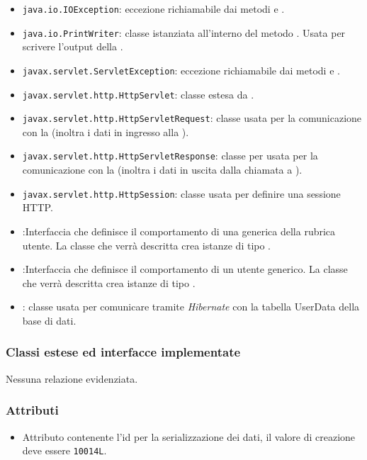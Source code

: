 \begin{itemize}
	\item \texttt{java.io.IOException}: eccezione richiamabile dai metodi  e .
	\item \texttt{java.io.PrintWriter}: classe istanziata all'interno del metodo . Usata per scrivere l'output della .
	\item \texttt{javax.servlet.ServletException}: eccezione richiamabile dai metodi  e .
	\item \texttt{javax.servlet.http.HttpServlet}: classe estesa da .
	\item \texttt{javax.servlet.http.HttpServletRequest}:  classe usata per la comunicazione con la  (inoltra i dati in ingresso alla ).
	\item \texttt{javax.servlet.http.HttpServletResponse}: classe per usata per la comunicazione con la  (inoltra i dati in uscita dalla chiamata a ).
	\item \texttt{javax.servlet.http.HttpSession}: classe usata per definire una sessione HTTP.
	\item {}:Interfaccia che definisce il comportamento di una generica  della rubrica utente. La classe che verrà descritta crea istanze di tipo .
	\item {}:Interfaccia che definisce il comportamento di un utente generico. La classe che verrà descritta crea istanze di tipo .
	\item {}: classe usata per comunicare tramite \textit{Hibernate} con la tabella UserData della base di dati.
\end{itemize}

\subsubsection*{Classi estese ed interfacce implementate}

Nessuna relazione evidenziata.

\subsubsection*{Attributi}

\begin{itemize}
	\item{}
	Attributo contenente l'id per la serializzazione dei dati, il valore di creazione deve essere \texttt{10014L}.
\end{itemize}

